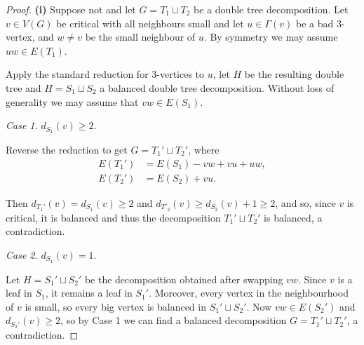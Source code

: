 \documentclass[11pt, reqno, a4paper]{article}
\theoremstyle{definition}
\numberwithin{equation}{section}
\renewcommand{\geq}{\geqslant}
\begin{document}
\begin{proof} \textbf{(i)}
Suppose not and let $G = T_1\sqcup T_2$ be a double tree decomposition. 
Let $v\in V(G)$ be critical with all neighbours small and let $u\in \Gamma(v)$ be a bad $3$-vertex, and $w\neq v$ be the small neighbour of $u$.
By symmetry we may assume $uw\in E(T_1)$.

Apply the standard reduction for $3$-vertices to $u$, let $H$ be the resulting double tree and $H= S_1\sqcup S_2$ a balanced double tree decomposition.
Without loss of generality we may assume that $vw\in E(S_1)$.

\textit{Case 1.} $d_{S_1}(v) \geq 2$.

Reverse the reduction to get $G=T_1'\sqcup T_2'$, where 
\begin{align*}
E(T_1') &= E(S_1) - vw + vu + uw,\\
E(T_2') &= E(S_2) + vu.
\end{align*}

Then $d_{T_1'}(v) = d_{S_1}(v)\geq 2$ and \(d_{T'_2}(v) \geq d_{S_2}(v) + 1 \geq 2\), and so, since $v$ is critical, it is balanced and thus the decomposition $T_1'\sqcup T_2'$ is balanced, a
contradiction.

\textit{Case 2.} $d_{S_1}(v) =1$.

Let $H=S_1'\sqcup S_2'$ be the decomposition obtained after swapping $vw$.
Since $v$ is a leaf in $S_1$, it remains a leaf in $S_1'$.
Moreover, every vertex in the neighbourhood of $v$ is small, so every big vertex is balanced in $S_1'\sqcup S_2'$.
Now $vw\in E(S_2')$ and $d_{S_2'}(v) \geq 2$, so by Case 1 we can find a balanced decomposition $G= T_1'\sqcup T_2'$, a 
contradiction.


\end{proof}
\end{document}

